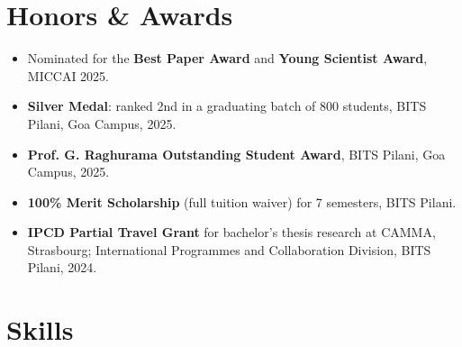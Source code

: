 \documentclass[letterpaper,11pt]{article}
\begin{document}
\section{Honors \& Awards}
\vspace{0.1em}
\begin{itemize}
    \item Nominated for the \textbf{Best Paper Award} and \textbf{Young Scientist Award}, MICCAI 2025.
    \item \textbf{Silver Medal}: ranked 2nd in a graduating batch of 800 students, BITS Pilani, Goa Campus, 2025.
    \item \textbf{Prof. G. Raghurama Outstanding Student Award}, BITS Pilani, Goa Campus, 2025.
    \item \textbf{100\% Merit Scholarship} (full tuition waiver) for 7 semesters, BITS Pilani.
    \item \textbf{IPCD Partial Travel Grant} for bachelor's thesis research at CAMMA, Strasbourg; International Programmes and Collaboration Division, BITS Pilani, 2024.
\end{itemize}
\vspace{-0.4em}


\section{Skills}
\vspace{0.2em}
\end{document}
